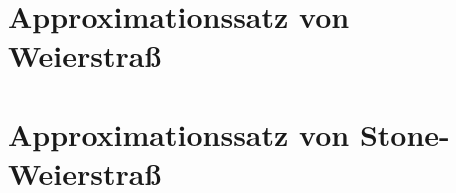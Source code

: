 \documentclass{handout}
\begin{document}
\maketitle
\section{Approximationssatz von Weierstraß}

\section{Approximationssatz von Stone-Weierstraß}


\makeliteratur{}
\end{document}
